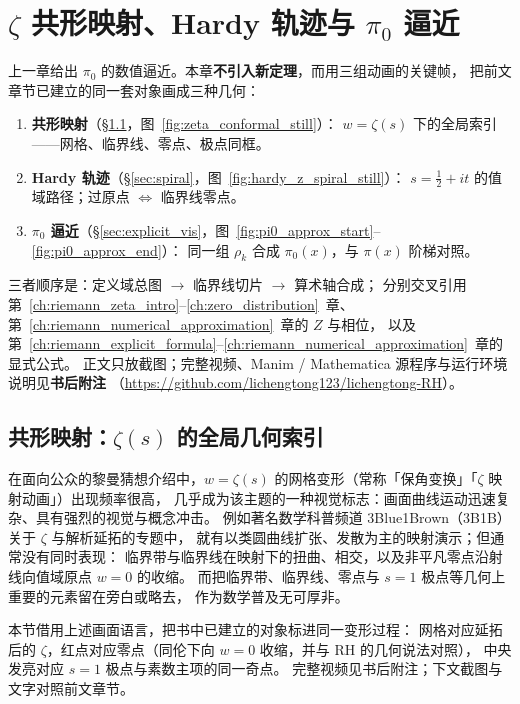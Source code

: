 \chapter{$\zeta$ 共形映射、Hardy 轨迹与 $\pi_0$ 逼近}\label{ch:visualization}

上一章给出 $\pi_0$ 的数值逼近。本章\textbf{不引入新定理}，而用三组动画的关键帧，
把前文章节已建立的同一套对象画成三种几何：
\begin{enumerate}
  \item \textbf{共形映射}（§\ref{sec:conformal_global}，图~\ref{fig:zeta_conformal_still}）：
        $w=\zeta(s)$ 下的全局索引——网格、临界线、零点、极点同框。
  \item \textbf{Hardy 轨迹}（§\ref{sec:spiral}，图~\ref{fig:hardy_z_spiral_still}）：
        $s=\frac12+it$ 的值域路径；过原点 $\Leftrightarrow$ 临界线零点。
  \item \textbf{$\pi_0$ 逼近}（§\ref{sec:explicit_vis}，图~\ref{fig:pi0_approx_start}--\ref{fig:pi0_approx_end}）：
        同一组 $\rho_k$ 合成 $\pi_0(x)$，与 $\pi(x)$ 阶梯对照。
\end{enumerate}
三者顺序是：定义域总图 $\to$ 临界线切片 $\to$ 算术轴合成；
分别交叉引用第~\ref{ch:riemann_zeta_intro}--\ref{ch:zero_distribution}~章、
第~\ref{ch:riemann_numerical_approximation}~章的 $Z$ 与相位，
以及第~\ref{ch:riemann_explicit_formula}--\ref{ch:riemann_numerical_approximation}~章的显式公式。
正文只放截图；完整视频、Manim / Mathematica 源程序与运行环境说明见\textbf{书后附注}
（\url{https://github.com/lichengtong123/lichengtong-RH}）。

\section{共形映射：\texorpdfstring{$\zeta(s)$}{Zeta(s)} 的全局几何索引}
\label{sec:conformal_global}

在面向公众的黎曼猜想介绍中，$w=\zeta(s)$ 的网格变形（常称「保角变换」「\(\zeta\) 映射动画」）出现频率很高，
几乎成为该主题的一种视觉标志：画面曲线运动迅速复杂、具有强烈的视觉与概念冲击。
例如著名数学科普频道 3Blue1Brown（3B1B）关于 $\zeta$ 与解析延拓的专题中，
就有以类圆曲线扩张、发散为主的映射演示；但通常没有同时表现：
临界带与临界线在映射下的扭曲、相交，以及非平凡零点沿射线向值域原点 $w=0$ 的收缩。
而把临界带、临界线、零点与 $s=1$ 极点等几何上重要的元素留在旁白或略去，
作为数学普及无可厚非。

本节借用上述画面语言，把书中已建立的对象标进同一变形过程：
网格对应延拓后的 $\zeta$，红点对应零点（同伦下向 $w=0$ 收缩，并与 RH 的几何说法对照），
中央发亮对应 $s=1$ 极点与素数主项的同一奇点。
完整视频见书后附注；下文截图与文字对照前文章节。

